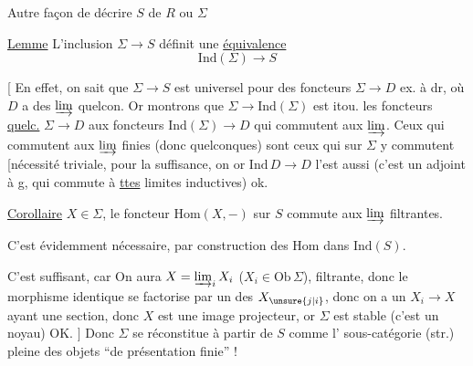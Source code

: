  Autre façon de décrire $S$ de $R$ ou $\Sigma$


\uline{Lemme}  L'inclusion $\Sigma\longrightarrow S$ définit une \uline{équivalence}
\[
\mathrm{Ind}(\Sigma)\longrightarrow S
\]

[ En effet,  on sait que $\Sigma\longrightarrow S$ est universel pour des foncteurs $\Sigma\longrightarrow D$ ex. à dr, où $D$ a des $\varinjlim$ quelcon. Or montrons que $\Sigma\longrightarrow\mathrm{Ind}(\Sigma)$ est  itou.   les foncteurs \uline{quelc.} $\Sigma\longrightarrow D$ 
aux foncteurs $\mathrm{Ind}(\Sigma)\longrightarrow D$ qui commutent aux $\varinjlim$. Ceux qui commutent aux $\varinjlim$ finies (donc quelconques) sont ceux qui sur $\Sigma$ y commutent [nécessité triviale, pour la suffisance, on   or $\mathrm{Ind}\,D\longrightarrow D$ l'est aussi (c'est un adjoint à g, qui commute à \uline{ttes} limites inductives) ok.

\uline{Corollaire}   $X\in\Sigma$,  le foncteur $\mathrm{Hom}(X,-)$ sur $S$ commute aux $\varinjlim$ filtrantes.


C'est évidemment nécessaire, par construction des Hom dans $\mathrm{Ind}(S)$.

C'est suffisant, car  On aura $X=\varinjlim_i X_i$ ($X_i\in\mathrm{Ob}\,\Sigma$), filtrante, donc le morphisme identique se factorise par un des $X_{\unsure{j|i}}$, donc on a un $X_i\longrightarrow X$ ayant une section, donc $X$ est une  image projecteur, or $\Sigma$ est  stable  (c'est un noyau)  OK. $]$
Donc $\Sigma$ se réconstitue à partir de $S$ comme l' sous-catégorie (str.) pleine des objets ``de présentation finie'' !

